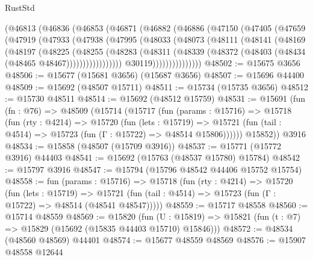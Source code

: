 \begin{lexlean}{RustStd}
\begin{coremodule}
            (@46813
              (@46836
                (@46853
                  (@46871
                    (@46882
                      (@46886
                        (@47150
                          (@47405
                            (@47659
                              (@47919
                                (@47933
                                  (@47938
                                    (@47995
                                      (@48033
                                        (@48073
                                          (@48111
                                            (@48141
                                              (@48169
                                                (@48197
                                                  (@48225
                                                    (@48255
                                                      (@48283
                                                        (@48311
                                                          (@48339
                                                            (@48372
                                                              (@48403
                                                                (@48434
                                                                  (@48465 @48467)))))))))))))))))
                                  @30119)))))))))))))))
@48502 := @15675 @3656
@48506 := @15677 (@15681 @3656) (@15687 @3656)
@48507 := @15696 @44400
@48509 := @15692 (@48507 @15711)
@48511 := @15734 (@15735 @3656)
@48512 := @15730 @48511
@48514 := @15692 (@48512 @15759)
@48531 := @15691
    (fun (fn : @76) =>
    @48509
      (@15714
        (@15717
          (fun (params : @15716) =>
          @15718
            (fun (rty : @4214) =>
            @15720
              (fun (lets : @15719) =>
              @15721 (fun (tail : @4514) => @15723 (fun (Γ : @15722) => @48514 @15806))))))
        @15852))
    @3916
@48534 := @15858 (@48507 (@15709 @3916))
@48537 := @15771 (@15772 @3916) @44403
@48541 := @15692 (@15763 (@48537 @15780) @15784)
@48542 := @15797 @3916
@48547 := @15794 (@15796 @48542 @44406 @15752 @15754)
@48558 := fun (params : @15716) =>
  @15718
    (fun (rty : @4214) =>
    @15720
      (fun (lets : @15719) =>
      @15721 (fun (tail : @4514) => @15723 (fun (Γ : @15722) => @48514 (@48541 @48547)))))
@48559 := @15717 @48558
@48560 := @15714 @48559
@48569 := @15820
    (fun (U : @15819) => @15821 (fun (t : @7) => @15829 (@15692 (@15835 @44403 @15710) @15846)))
@48572 := @48534 (@48560 @48569) @44401
@48574 := @15677 @48559 @48569
@48576 := @15907 @48558 @12644

\end{coremodule}
\end{lexlean}
